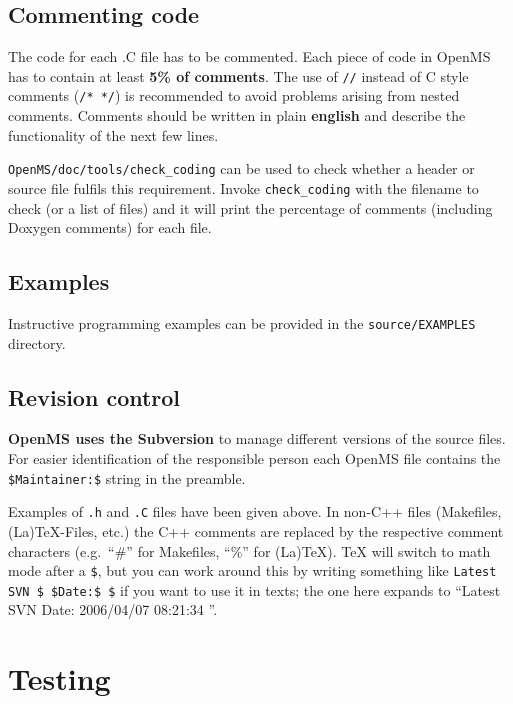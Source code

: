 \documentclass[a4]{article}
\begin{document}
\subsection{Commenting code}

The code for each .C file has to be commented. Each piece of code in OpenMS
has to contain at least {\bf 5\% of comments}. The use of {\tt //} instead of
C style comments ({\tt /* */}) is recommended to avoid problems arising from
nested comments. Comments should be written in plain \textbf{english} and
describe the functionality of the next few lines.

{\tt OpenMS/doc/tools/check\_coding} can be used to check whether a header or 
source file fulfils this requirement. Invoke {\tt check\_coding} with the
filename to check (or a list of files) and it will print the percentage of
comments (including Doxygen comments) for each file.


\subsection{Examples}

Instructive programming examples can be provided in the
\texttt{source/EXAMPLES} directory.


\subsection{Revision control}

\textbf{OpenMS uses the Subversion} to manage different
versions of the source files. For easier identification of the responsible person
each OpenMS file contains the \texttt{\$Maintainer{}:\$} string in the
preamble.

Examples of \texttt{.h} and \texttt{.C} files have been given above.  In
non-C++ files (Makefiles, (La)TeX-Files, etc.) the C++ comments are replaced
by the respective comment characters (e.g.\ ``\#'' for Makefiles, ``\%'' for
(La)TeX).  TeX will switch to math mode after a \texttt{\$}, but you can work
around this by writing something like
\mbox{\texttt{Latest SVN \$ \$Date{}:\$ \$}}
if you want to use it in texts; the one here expands to ``Latest SVN $
$Date: 2006/04/07 08:21:34 $ $''.

\section{Testing} 
\end{document}
